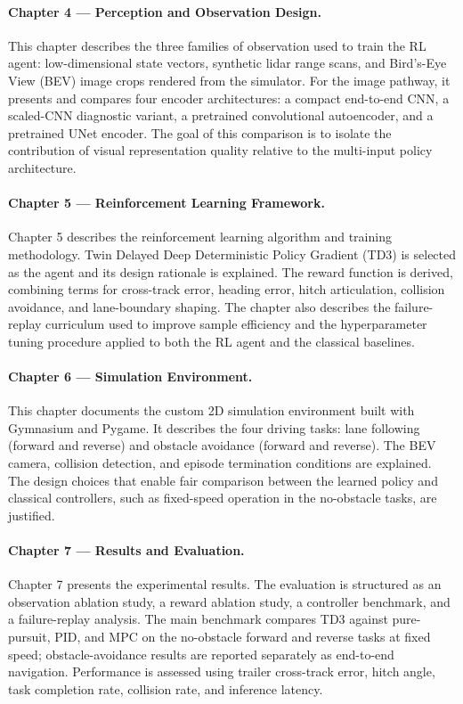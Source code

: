 \paragraph{Chapter 4 — Perception and Observation Design.}
This chapter describes the three families of observation used to train the RL agent: low-dimensional state vectors, synthetic lidar range scans, and Bird's-Eye View (BEV) image crops rendered from the simulator. For the image pathway, it presents and compares four encoder architectures: a compact end-to-end CNN, a scaled-CNN diagnostic variant, a pretrained convolutional autoencoder, and a pretrained UNet encoder. The goal of this comparison is to isolate the contribution of visual representation quality relative to the multi-input policy architecture.

\paragraph{Chapter 5 — Reinforcement Learning Framework.}
Chapter 5 describes the reinforcement learning algorithm and training methodology. Twin Delayed Deep Deterministic Policy Gradient (TD3) is selected as the agent and its design rationale is explained. The reward function is derived, combining terms for cross-track error, heading error, hitch articulation, collision avoidance, and lane-boundary shaping. The chapter also describes the failure-replay curriculum used to improve sample efficiency and the hyperparameter tuning procedure applied to both the RL agent and the classical baselines.

\paragraph{Chapter 6 — Simulation Environment.}
This chapter documents the custom 2D simulation environment built with Gymnasium and Pygame. It describes the four driving tasks: lane following (forward and reverse) and obstacle avoidance (forward and reverse). The BEV camera, collision detection, and episode termination conditions are explained. The design choices that enable fair comparison between the learned policy and classical controllers, such as fixed-speed operation in the no-obstacle tasks, are justified.

\paragraph{Chapter 7 — Results and Evaluation.}
Chapter 7 presents the experimental results. The evaluation is structured as an observation ablation study, a reward ablation study, a controller benchmark, and a failure-replay analysis. The main benchmark compares TD3 against pure-pursuit, PID, and MPC on the no-obstacle forward and reverse tasks at fixed speed; obstacle-avoidance results are reported separately as end-to-end navigation. Performance is assessed using trailer cross-track error, hitch angle, task completion rate, collision rate, and inference latency.

